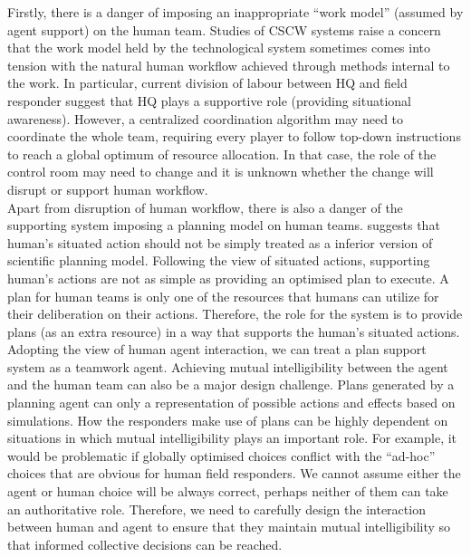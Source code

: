 Firstly, there is a danger of imposing an inappropriate ``work model'' (assumed by agent support) on the human team. Studies of \ac{CSCW} systems \cite{Bowers1994} raise a concern that the work model held by the technological system sometimes comes into tension with the natural human workflow achieved through methods internal to the work. In particular, current division of labour between HQ and field responder suggest that HQ plays a supportive role (providing situational awareness). However, a centralized coordination algorithm may need to coordinate the whole team, requiring every player to follow top-down instructions to reach a global optimum of resource allocation. In that case, the role of the control room may need to change and it is unknown whether the change will disrupt or support human workflow. \\

Apart from disruption of human workflow, there is also a danger of the supporting system imposing a planning model on human teams. \cite{Suchman1987} suggests that human's situated action should not be simply treated as a inferior version of scientific planning model. Following the view of situated actions, supporting human's actions are not as simple as providing an optimised plan to execute. A plan for human teams is only one of the resources that humans can utilize for their deliberation on their actions. Therefore, the role for the system is to provide plans (as an extra resource) in a way that supports the human's situated actions. \\

Adopting the view of human agent interaction, we can treat a plan support system as a teamwork agent.  Achieving mutual intelligibility between the agent and the human team can also be a major design challenge. Plans generated by a planning agent can only a representation of possible actions and effects based on simulations. How the responders make use of plans can be highly dependent on situations in which mutual intelligibility plays an important role. For example, it would be problematic if globally optimised choices conflict with the ``ad-hoc'' choices that are obvious for human field responders. We cannot assume either the agent or human choice will be always correct, perhaps neither of them can take an authoritative role. Therefore, we need to carefully design the interaction between human and agent to ensure that they maintain mutual intelligibility so that informed collective decisions can be reached.  \\

